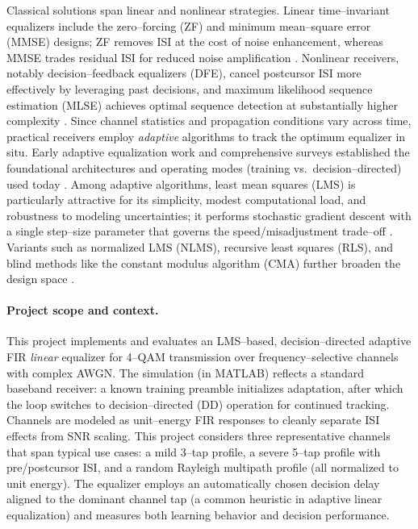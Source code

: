 \documentclass[12pt]{article}
\begin{document}
Classical solutions span linear and nonlinear strategies. Linear time--invariant equalizers include the zero--forcing (ZF) and minimum mean--square error (MMSE) designs; ZF removes ISI at the cost of noise enhancement, whereas MMSE trades residual ISI for reduced noise amplification \cite{proakis}. Nonlinear receivers, notably decision--feedback equalizers (DFE), cancel postcursor ISI more effectively by leveraging past decisions, and maximum likelihood sequence estimation (MLSE) achieves optimal sequence detection at substantially higher complexity \cite{proakis}. Since channel statistics and propagation conditions vary across time, practical receivers employ \emph{adaptive} algorithms to track the optimum equalizer in situ. Early adaptive equalization work and comprehensive surveys established the foundational architectures and operating modes (training vs.\ decision--directed) used today \cite{lucky,qureshi}. Among adaptive algorithms, least mean squares (LMS) is particularly attractive for its simplicity, modest computational load, and robustness to modeling uncertainties; it performs stochastic gradient descent with a single step--size parameter that governs the speed/misadjustment trade--off \cite{haykin,qureshi}. Variants such as normalized LMS (NLMS), recursive least squares (RLS), and blind methods like the constant modulus algorithm (CMA) further broaden the design space \cite{haykin,qureshi}.

\paragraph{Project scope and context.}
This project implements and evaluates an LMS--based, decision--directed adaptive FIR \emph{linear} equalizer for 4--QAM transmission over frequency--selective channels with complex AWGN. The simulation (in MATLAB) reflects a standard baseband receiver: a known training preamble initializes adaptation, after which the loop switches to decision--directed (DD) operation for continued tracking. Channels are modeled as unit--energy FIR responses to cleanly separate ISI effects from SNR scaling. This project considers three representative channels that span typical use cases: a mild 3--tap profile, a severe 5--tap profile with pre/postcursor ISI, and a random Rayleigh multipath profile (all normalized to unit energy). The equalizer employs an automatically chosen decision delay aligned to the dominant channel tap (a common heuristic in adaptive linear equalization) and measures both learning behavior and decision performance.
\end{document}
